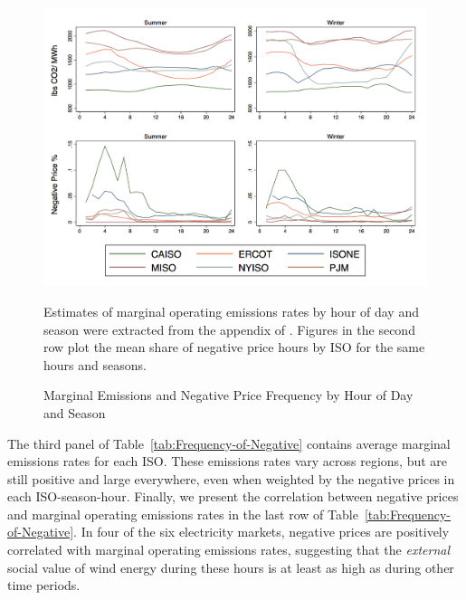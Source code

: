 \documentclass[12pt]{article}
\begin{document}
\clearpage
\begin{figure}[H]
\noindent\begin{minipage}[t]{1\textwidth}%
\begin{center}
\caption{Marginal Emissions and Negative Price Frequency by Hour of Day and Season \label{fig:moer_np_season}}
\par\end{center}
\begin{center}
\includegraphics[width=1\textwidth]{../output/figures/moer_np_season.png}
\par\end{center}
Estimates of marginal operating emissions rates by hour of day and season were extracted from the appendix of \citet{callaway_location_2018}. Figures in the second row plot the mean share of negative price hours by ISO for the same hours and seasons. %
\end{minipage}
\end{figure}

The third panel of Table~\ref{tab:Frequency-of-Negative} contains average marginal emissions rates for each ISO. These emissions rates vary across regions, but are still positive and large everywhere, even when weighted by the negative prices in each ISO-season-hour. Finally, we present the correlation between negative prices and marginal operating emissions rates in the last row of Table~\ref{tab:Frequency-of-Negative}. In four of the six electricity markets, negative prices are positively correlated with marginal operating emissions rates, suggesting that the \textit{external} social value of wind energy during these hours is at least as high as during other time periods.
\end{document}
